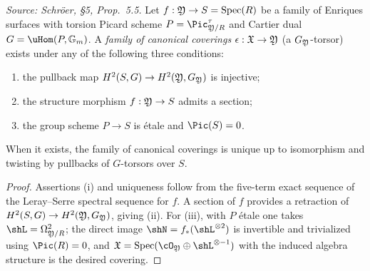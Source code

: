 \begin{proposition}
  \label{prop:canonical-covering}
  \textit{Source: Schr\"oer, §5, Prop.~5.5.}
  Let \(f : \mathfrak{Y} \to S = \mathrm{Spec}(R)\) be a family of Enriques surfaces with torsion Picard scheme
  \(P = \Pic^{\tau}_{\foY/R}\) and Cartier dual \(G = \uHom(P, \GG_m)\).
  A \emph{family of canonical coverings} \(\epsilon : \mathfrak{X} \to \mathfrak{Y}\) (a \(G_{\mathfrak{Y}}\)-torsor) exists
  under any of the following three conditions:
  \begin{enumerate}
  \item the pullback map \(H^2(S, G) \to H^2(\mathfrak{Y}, G_{\mathfrak{Y}})\) is injective;
  \item the structure morphism \(f : \mathfrak{Y} \to S\) admits a section;
  \item the group scheme \(P \to S\) is \'etale and \(\Pic(S) = 0\).
  \end{enumerate}
  When it exists, the family of canonical coverings is unique up to isomorphism and twisting by pullbacks of
  \(G\)-torsors over \(S\).
\end{proposition}
\begin{proof}
  Assertions (i) and uniqueness follow from the five-term exact sequence of the Leray--Serre spectral sequence
  for \(f\). A section of \(f\) provides a retraction of \(H^2(S, G) \to H^2(\mathfrak{Y}, G_{\mathfrak{Y}})\), giving (ii).
  For (iii), with \(P\) \'etale one takes \(\shL = \Omega^2_{\foY/R}\); the direct image \(\shN = f_*(\shL^{\otimes 2})\)
  is invertible and trivialized using \(\Pic(R) = 0\), and \(\foX = \Spec(\cO_{\foY} \oplus \shL^{\otimes -1})\)
  with the induced algebra structure is the desired covering.
\end{proof}

